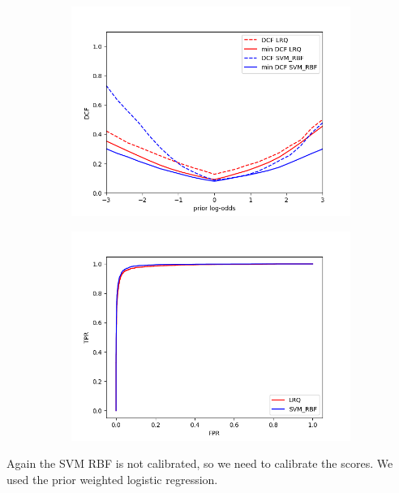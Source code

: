 \documentclass[english]{report}
\begin{document}
\begin{figure}[H]
    \begin{subfigure}{0.5\textwidth}
        \includegraphics[scale=0.5]{../../images/comparison/evaluation/DCF_LRQ&SVM_RBF}
    \end{subfigure}
    \begin{subfigure}{0.5\textwidth}
        \includegraphics[scale=0.5]{../../images/comparison/evaluation/ROC_LRQ&SVM_RBF}
    \end{subfigure}
    \label{fig:eval_MVGvsSVM}
\end{figure}
Again the SVM RBF is not calibrated, so we need to calibrate the scores.
We used the prior weighted logistic regression.
\end{document}

